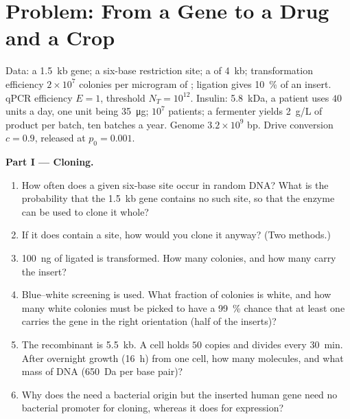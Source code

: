 \section{Problem: From a Gene to a Drug and a Crop}

\begin{problem}
\label{pb:b3:genetic-engineering:1}
Data: a \qty{1.5}{kb} gene; a six-base restriction site; a  of
\qty{4}{kb}; transformation efficiency $2\times 10^{7}$ colonies per
microgram of ; ligation gives \qty{10}{\%} of  an
insert. qPCR efficiency $E = 1$, threshold $N_{T} = 10^{12}$. Insulin:
\qty{5.8}{kDa}, a patient uses $40$ units a day, one unit being
\qty{35}{\micro g}; $10^{7}$ patients; a fermenter yields
\qty{2}{g/L} of product per batch, ten batches a year. Genome $3.2\times
10^{9}$ bp. Drive conversion $c = 0.9$, released at $p_{0} = 0.001$.

\medskip
\noindent\textbf{Part I --- Cloning.}
\begin{enumerate}
  \item How often does a given six-base site occur in random DNA? What
        is the probability that the \qty{1.5}{kb} gene contains no
        such site, so that the enzyme can be used to clone it whole?
  \item If it does contain a site, how would you clone it anyway?
        (Two methods.)
  \item \qty{100}{ng} of ligated  is transformed. How many
        colonies, and how many carry the insert?
  \item Blue--white screening is used. What fraction of colonies is
        white, and how many white colonies must be picked to have a
        \qty{99}{\%} chance that at least one carries the gene in the
        right orientation (half of the inserts)?
  \item The recombinant  is \qty{5.5}{kb}. A cell holds $50$
        copies and divides every \qty{30}{min}. After overnight growth
        (\qty{16}{h}) from one cell, how many  molecules, and
        what mass of  DNA (\qty{650}{Da} per base pair)?
  \item Why does the  need a bacterial origin but the inserted
        human gene need no bacterial promoter for cloning, whereas it
        does for expression?
\end{enumerate}


\end{problem}
